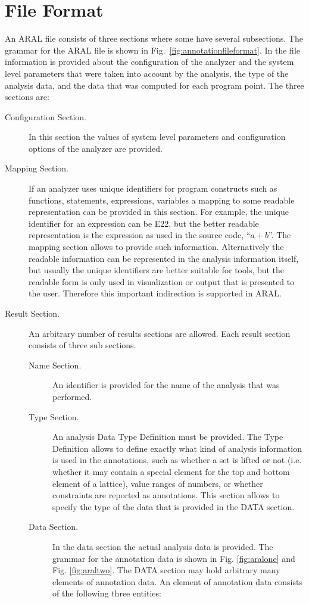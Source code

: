 \chapter{File Format}

An ARAL file consists of three sections where some have several subsections. The grammar for the ARAL file
is shown in Fig.~\ref{fig:annotationfileformat}. In the file
information is provided about the configuration of the analyzer and
the system level parameters that were taken into account by the
analysis, the type of the analysis data, and the data that was
computed for each program point. The three sections are:

\begin{description}
\item [Configuration Section.] In this section the values of system
level parameters and configuration options of the analyzer are
provided.
\item [Mapping Section.] If an analyzer uses unique identifiers for
program constructs such as functions, statements, expressions,
variables a mapping to some readable representation can be provided in
this section. For example, the unique identifier for an expression can
be E22, but the better readable representation is the expression as
used in the source code, ``$a+b$''. The mapping section allows to
provide such information. Alternatively the readable information can
be represented in the analysis information itself, but usually the
unique identifiers are better suitable for tools, but the readable
form is only used in visualization or output that is presented to the
user. Therefore this important indirection is supported in ARAL.
\item [Result Section.] An arbitrary number of results sections are allowed.
Each result section consists of three sub sections.

\begin{description}
\item [Name Section.] An identifier is provided for the name of the analysis that was performed.
\item [Type Section.] An analysis Data Type Definition must be
provided.  The Type Definition allows to define exactly what kind of
analysis information is used in the annotations, such as whether a set
is lifted or not (i.e. whether it may contain a special element for
the top and bottom element of a lattice), value ranges of numbers, or
whether constraints are reported as annotations. This section allows
to specify the type of the data that is provided in the DATA section.
\item [Data Section.]
In the data section the actual analysis data is provided. The grammar
for the annotation data is shown in Fig. \ref{fig:aralone} and
Fig. \ref{fig:araltwo}. The DATA section may hold arbitrary many
elements of annotation data. An element of annotation data consists of the following three entities:


\end{description}
\end{description}
